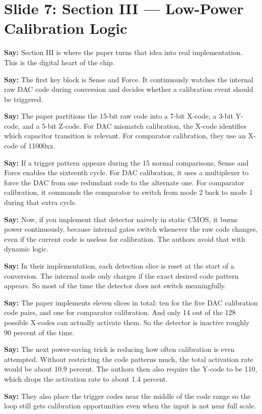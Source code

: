 \documentclass[11pt]{article}
\newcommand{\speak}[1]{\textbf{Say:} #1}
\begin{document}
\section*{Slide 7: Section III --- Low-Power Calibration Logic}
\speak{Section III is where the paper turns that idea into real implementation. This is the digital heart of the chip.}

\speak{The first key block is Sense and Force. It continuously watches the internal raw DAC code during conversion and decides whether a calibration event should be triggered.}

\speak{The paper partitions the 15-bit raw code into a 7-bit X-code, a 3-bit Y-code, and a 5-bit Z-code. For DAC mismatch calibration, the X-code identifies which capacitor transition is relevant. For comparator calibration, they use an X-code of 11000xx.}

\speak{If a trigger pattern appears during the 15 normal comparisons, Sense and Force enables the sixteenth cycle. For DAC calibration, it uses a multiplexer to force the DAC from one redundant code to the alternate one. For comparator calibration, it commands the comparator to switch from mode 2 back to mode 1 during that extra cycle.}

\speak{Now, if you implement that detector naively in static CMOS, it burns power continuously, because internal gates switch whenever the raw code changes, even if the current code is useless for calibration. The authors avoid that with dynamic logic.}

\speak{In their implementation, each detection slice is reset at the start of a conversion. The internal node only charges if the exact desired code pattern appears. So most of the time the detector does not switch meaningfully.}

\speak{The paper implements eleven slices in total: ten for the five DAC calibration code pairs, and one for comparator calibration. And only 14 out of the 128 possible X-codes can actually activate them. So the detector is inactive roughly 90 percent of the time.}

\speak{The next power-saving trick is reducing how often calibration is even attempted. Without restricting the code patterns much, the total activation rate would be about 10.9 percent. The authors then also require the Y-code to be 110, which drops the activation rate to about 1.4 percent.}

\speak{They also place the trigger codes near the middle of the code range so the loop still gets calibration opportunities even when the input is not near full scale.}
\end{document}
